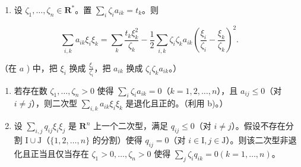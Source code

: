\begin{enumerate}
\def\labelenumi{\alph{enumi})}
\setcounter{enumi}{1}
\tightlist
\item
  设 \(\zeta_1, \ldots, \zeta_n \in \mathbf{R}^*\)。置 \(\sum_{i} \zeta_i a_{ik} = t_k\)。则
\end{enumerate}

\[
\sum_ {i, k} a _ {i k} \xi_ {i} \xi_ {k} = \sum_ {k} \frac {t _ {k} \xi_ {k} ^ {2}}{\zeta_ {k}} - \frac {1}{2} \sum_ {i, k} \zeta_ {i} \zeta_ {k} a _ {i k} \left(\frac {\xi_ {i}}{\zeta_ {i}} - \frac {\xi_ {k}}{\zeta_ {k}}\right) ^ {2}.
\]

（在 \(a\) ) 中，把 \(\xi_{i}\) 换成 \(\frac{\xi_i}{\zeta_i}\)，把 \(a_{ik}\) 换成 \(\zeta_i\zeta_k a_{ik}\)。）

\begin{enumerate}
\def\labelenumi{\alph{enumi})}
\setcounter{enumi}{2}
\item
  若存在数 \(\zeta_1, \ldots, \zeta_n > 0\) 使得 \(\sum_{i} \zeta_i a_{ik} = 0\)（\(k = 1, 2, \ldots, n\)），且 \(a_{ij} \leqslant 0\)（对 \(i \neq j\)），则二次型 \(\sum_{i,k} a_{ik} \xi_i \xi_k\) 是退化且正的。（利用 b)。）
\item
  设 \(\sum_{i,j} q_{ij} \xi_i \xi_j\) 是 \(\mathbf{R}^n\) 上一个二次型，满足 \(q_{ij} \leqslant 0\)（对 \(i \neq j\)）。假设不存在分割 \(\mathrm{I} \cup \mathrm{J}\)（\(\{1,2,\ldots,n\}\) 的分割）使得 \(q_{ij} = 0\)（对 \(i \in \mathrm{I}, j \in \mathrm{J}\)）。则该二次型非退化且正当且仅当存在 \(\zeta_1 > 0, \ldots, \zeta_n > 0\) 使得 \(\sum_{j} \zeta_i q_{ik} = 0 (k = 1, \ldots, n)\)。
\end{enumerate}

